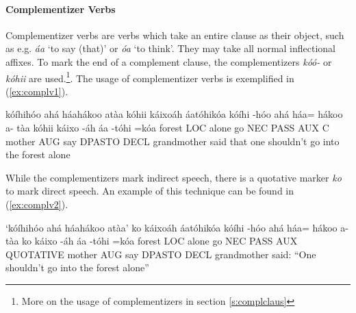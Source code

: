 \documentclass[a4paper, 12pt, oneside]{memoir}
\newcommand{\emh}[1]{\textit{#1}}
\begin{document}
\paragraph{Complementizer Verbs}
Complementizer verbs are verbs which take an entire clause as their object, such as e.g. \emh{áa} `to say (that)' or \emh{óa} `to think'. They may take all normal inflectional affixes. To mark the end of a complement clause, the complementizers \emh{kóó-} or \emh{kóhii} are used.\footnote{More on the usage of complementizers  in section \ref{s:complclaus}}. The usage of complementizer verbs is exemplified in (\ref{ex:complv1}).
\begin{examples}
    \ex \label{ex:complv1}
    \words kóíhihóo ahá háahákoo atàa kóhii káixoáh áatóhikóa
    \bits kóíhi -hóo ahá háa= hákoo a- tàa kóhii káixo -áh áa -tóhi =kóa
    \gloss forest LOC alone go NEC PASS AUX C mother AUG say DPASTO DECL
    \tr [My] grandmother said that one shouldn't go into the forest alone
\end{examples}
While the complementizers mark indirect speech, there is a quotative marker \emh{ko} to mark direct speech. An example of this technique can be found in (\ref{ex:complv2}).
\begin{examples}
    \ex \label{ex:complv2}
    \words `kóíhihóo ahá háahákoo atàa' ko káixoáh áatóhikóa
    \bits kóíhi -hóo ahá háa= hákoo a- tàa ko  káixo -áh áa -tóhi =kóa
    \gloss forest LOC alone go NEC PASS AUX QUOTATIVE mother AUG say DPASTO DECL
    \tr [My] grandmother said: ``One shouldn't go into the forest alone''
\end{examples}
\end{document}
